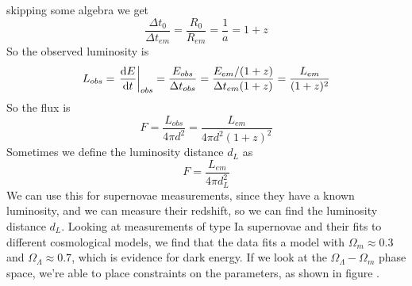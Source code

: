 skipping some algebra we get
\begin{equation}
    \frac{\Delta t_{0}}{\Delta t_{em}} = \frac{R_0}{R_{em}} = \frac{1}{a} = 1 + z
\end{equation}
So the observed luminosity is
\begin{equation}
    L_{obs} = \left.\diff{E}{t}\right\vert_{obs} = \frac{E_{obs}}{\Delta t_{obs}} = \frac{E_{em}/(1+z)}{\Delta t_{em} (1+z)} = \frac{L_{em}}{(1+z)^2}
\end{equation}
So the flux is
\begin{equation}
    F = \frac{L_{obs}}{4\pi d^2} = \frac{L_{em}}{4\pi d^2 (1+z)^2}
\end{equation}
Sometimes we define the luminosity distance \(d_L\) as
\begin{equation}
    F = \frac{L_{em}}{4\pi d_L^2}
\end{equation}
We can use this for supernovae measurements, since they have a known luminosity, and we can measure their redshift, so we can find the luminosity distance \(d_L\). Looking at measurements of type Ia supernovae and their fits to different cosmological models, we find that the data fits a model with \(\Omega_m \approx 0.3\) and \(\Omega_\Lambda \approx 0.7\), which is evidence for dark energy. If we look at the \(\Omega_\Lambda-\Omega_m\) phase space, we're able to place constraints on the parameters, as shown in figure .
